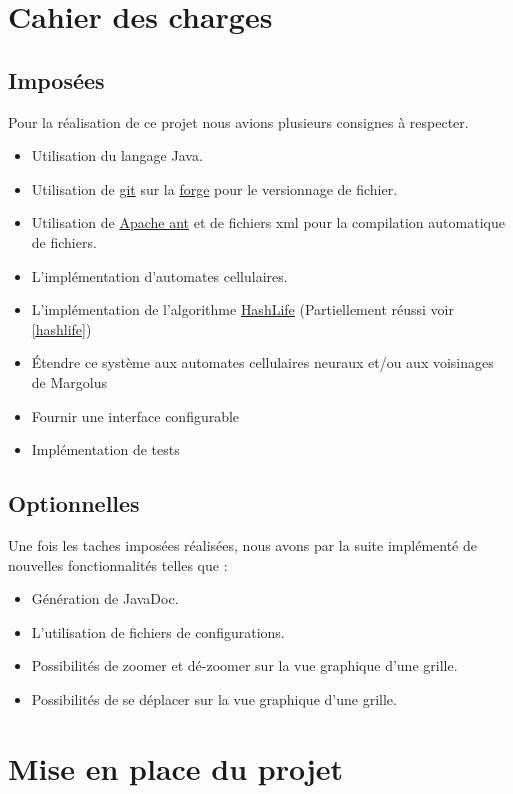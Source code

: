 \documentclass[12pt]{article}
\begin{document}
	
	\section{Cahier des charges}
		\subsection{Imposées}
			Pour la réalisation de ce projet nous avions plusieurs consignes à respecter.
			\begin{itemize}[label=\textbullet]
				\item Utilisation du langage Java.
				\item Utilisation de \href{https://git-scm.com/}{git} sur la \href{https://forge.info.unicaen.fr/}{forge} pour le versionnage de fichier.
				\item Utilisation de \href{https://ant.apache.org/}{Apache ant} et de fichiers xml pour la compilation automatique de fichiers.
				\item L'implémentation d'automates cellulaires.
				\item L'implémentation de l'algorithme  \href{https://en.wikipedia.org/wiki/Hashlife}{HashLife} (Partiellement réussi voir \ref{hashlife})
				\item Étendre ce système aux automates cellulaires neuraux et/ou aux voisinages de Margolus
				\item Fournir une interface configurable
				\item Implémentation de tests
			\end{itemize}
		
		\subsection{Optionnelles}
			Une fois les taches imposées réalisées, nous avons par la suite implémenté de nouvelles fonctionnalités telles que : 
			\begin{itemize}[label=\textbullet]
				\item Génération de JavaDoc.
				\item L'utilisation de fichiers de configurations.
				\item Possibilités de zoomer et dé-zoomer sur la vue graphique d'une grille.
				\item Possibilités de se déplacer sur la vue graphique d'une grille.
			\end{itemize}
	
	
	\section{Mise en place du projet}
\end{document}

